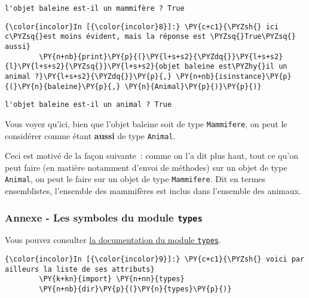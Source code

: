     \begin{Verbatim}[commandchars=\\\{\},frame=single,framerule=0.3mm,rulecolor=\color{cellframecolor}]
l'objet baleine est-il un mammifère ? True
\end{Verbatim}

    \begin{Verbatim}[commandchars=\\\{\},frame=single,framerule=0.3mm,rulecolor=\color{cellframecolor}]
{\color{incolor}In [{\color{incolor}8}]:} \PY{c+c1}{\PYZsh{} ici c\PYZsq{}est moins évident, mais la réponse est \PYZsq{}True\PYZsq{} aussi}
        \PY{n+nb}{print}\PY{p}{(}\PY{l+s+s2}{\PYZdq{}}\PY{l+s+s2}{l}\PY{l+s+s2}{\PYZsq{}}\PY{l+s+s2}{objet baleine est\PYZhy{}il un animal ?}\PY{l+s+s2}{\PYZdq{}}\PY{p}{,} \PY{n+nb}{isinstance}\PY{p}{(}\PY{n}{baleine}\PY{p}{,} \PY{n}{Animal}\PY{p}{)}\PY{p}{)}
\end{Verbatim}


    \begin{Verbatim}[commandchars=\\\{\},frame=single,framerule=0.3mm,rulecolor=\color{cellframecolor}]
l'objet baleine est-il un animal ? True
\end{Verbatim}

    Vous voyez qu'ici, bien que l'objet baleine soit de type
\texttt{Mammifere}, on peut le considérer comme étant \textbf{aussi} de
type \texttt{Animal}.

Ceci est motivé de la façon suivante~: comme on l'a dit plus haut, tout
ce qu'on peut faire (en matière notamment d'envoi de méthodes) sur un
objet de type \texttt{Animal}, on peut le faire sur un objet de type
\texttt{Mammifere}. Dit en termes ensemblistes, l'ensemble des
mammifères est inclus dans l'ensemble des animaux.

    \hypertarget{annexe---les-symboles-du-module-types}{%
\subsubsection{\texorpdfstring{Annexe - Les symboles du module
\texttt{types}}{Annexe - Les symboles du module types}}\label{annexe---les-symboles-du-module-types}}

    Vous pouvez consulter
\href{https://docs.python.org/3/library/types.html}{la documentation du
module \texttt{types}}.

    \begin{Verbatim}[commandchars=\\\{\},frame=single,framerule=0.3mm,rulecolor=\color{cellframecolor}]
{\color{incolor}In [{\color{incolor}9}]:} \PY{c+c1}{\PYZsh{} voici par ailleurs la liste de ses attributs}
        \PY{k+kn}{import} \PY{n+nn}{types} 
        \PY{n+nb}{dir}\PY{p}{(}\PY{n}{types}\PY{p}{)}
\end{Verbatim}


